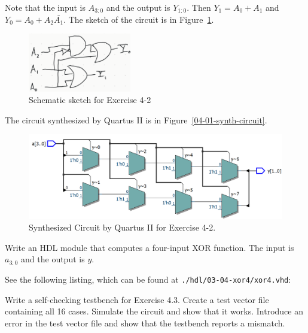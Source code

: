 \documentclass[12pt]{article}
\newenvironment{ex}[2][Exercise]{\begin{trivlist}
		\item[\hskip \labelsep {\bfseries #1}\hskip \labelsep {\bfseries #2.}]}{\end{trivlist}}
\newenvironment{sol}[1][Solution]{\begin{trivlist}
		\item[\hskip \labelsep {\bfseries #1:}]}{\end{trivlist}}
\begin{document}
\begin{sol}
	Note that the input is $A_{3:0}$ and the output is $Y_{1:0}$. Then $Y_1=A_0+A_1$ and
	$Y_0=A_0+A_2\bar{A_1}$. The sketch of the circuit is in Figure~\ref{04-02-circuit-sketch}.
	\begin{figure}
		\centering
		\includegraphics[width=0.4\textwidth]{04-02-circuit-sketch}
		\caption{Schematic sketch for Exercise 4-2}
		\label{04-02-circuit-sketch}
	\end{figure}
		The circuit synthesized by Quartus II is in Figure~\ref{04-01-synth-circuit}.
	\begin{figure}
		\centering
		\includegraphics[width=0.8 \textwidth]{04-02-synth-circuit}
		\caption{Synthesized Circuit by Quartus II for Exercise 4-2.}
		\label{04-02-synth-circuit}
	\end{figure}
\end{sol}

\begin{ex}{4.3}
	Write an HDL module that computes a four-input XOR function. The input is $a_{3:0}$ and
	the output is $y$.
\end{ex}

\begin{sol}
	See the following listing, which can be found at
	\texttt{./hdl/03-04-xor4/xor4.vhd}:
	
\end{sol}

\begin{ex}{4.4}
	Write a self-checking testbench for Exercise 4.3. Create a test vector file containing all 16 cases. Simulate the circuit and show that it works. Introduce an error in the 
	test vector file and show that the testbench reports a mismatch.
\end{ex}
\end{document}
